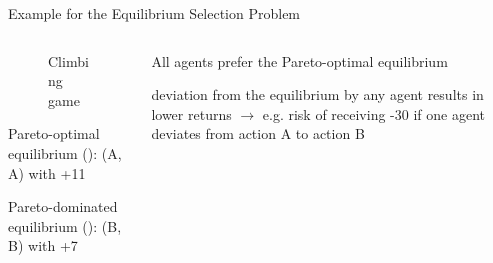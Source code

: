 \begin{frame}[t]{Example for the Equilibrium Selection Problem}
    \begin{columns}
        \begin{column}{.40\textwidth}
            \begin{figure}
                \centering
                \caption{Climbing game}
            \end{figure}

            \vspace{1em}
            \blist
                \item Pareto-optimal equilibrium (\ddag): (A, A) with +11
                \item Pareto-dominated equilibrium (\dag): (B, B) with +7
            \elist
        \end{column}
        \begin{column}{.60\textwidth}
            \blist
                \item<2-> All agents prefer the Pareto-optimal equilibrium
                    \item<2->  deviation from the equilibrium by any agent results in lower returns $\rightarrow$ e.g. risk of receiving -30 if one agent deviates from action A to action B
            \elist

            \vspace{-.5em}


        \end{column}
    \end{columns}
\end{frame}

